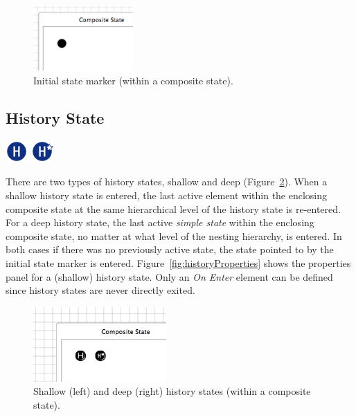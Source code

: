 \documentclass[11pt]{amsart}
\begin{document}
\begin{figure}
\begin{center}
\vspace{.2in}
\centerline {
\includegraphics[width=1.5in]{StatechartsImages/InitialStateMarker.png}
}
\caption{Initial state marker (within a composite state).}
\label{fig:initialStateMarker}
\end{center}
\end{figure}


\subsection{History State}
\label{sec:historyState}
\includegraphics[height=.2in]{StatechartsImages/Shallow-History-32.png} \includegraphics[height=.2in]{StatechartsImages/Deep-History-32.png}

There are two types of history states, shallow and deep (Figure~\ref{fig:history}). When a shallow history state is entered, the last active element within the enclosing composite state at the same hierarchical level of the history state is re-entered. For a deep history state, the last active \emph{simple state} within the enclosing composite state, no matter at what level of the nesting hierarchy, is entered. In both cases if there was no previously active state, the state pointed to by the initial state marker is entered. Figure~\ref{fig:historyProperties} shows the properties panel for a (shallow) history state. Only an \emph{On Enter} element can be defined since history states are never directly exited.


\begin{figure}
\begin{center}
\vspace{.2in}
\centerline {
\includegraphics[width=2in]{StatechartsImages/History.png}
}
\caption{Shallow (left) and deep (right) history states (within a composite state).}
\label{fig:history}
\end{center}
\end{figure}
\end{document}

